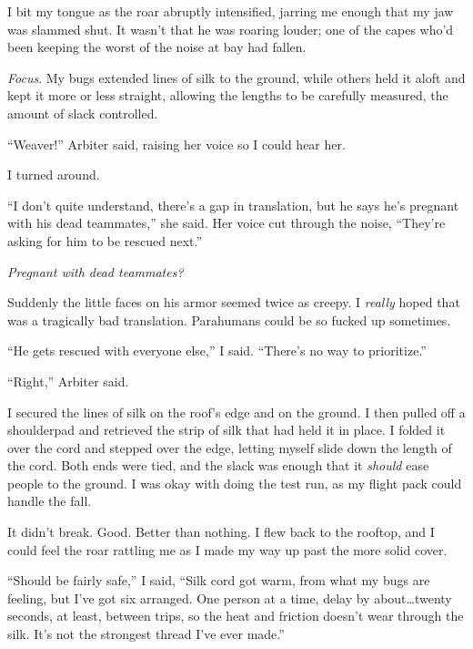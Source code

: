 I bit my tongue as the roar abruptly intensified, jarring me enough that my jaw was slammed shut.  It wasn't that he was roaring louder; one of the capes who'd been keeping the worst of the noise at bay had fallen.



\emph{Focus}.  My bugs extended lines of silk to the ground, while others held it aloft and kept it more or less straight, allowing the lengths to be carefully measured, the amount of slack controlled.



``Weaver!'' Arbiter said, raising her voice so I could hear her.



I turned around.



``I don't quite understand, there's a gap in translation, but he says he's pregnant with his dead teammates,'' she said.  Her voice cut through the noise, ``They're asking for him to be rescued next.''



\emph{Pregnant with dead teammates?}



Suddenly the little faces on his armor seemed twice as creepy.  I \emph{really} hoped that was a tragically bad translation.  Parahumans could be so fucked up sometimes.



``He gets rescued with everyone else,'' I said.  ``There's no way to prioritize.''



``Right,'' Arbiter said.



I secured the lines of silk on the roof's edge and on the ground.  I then pulled off a shoulderpad and retrieved the strip of silk that had held it in place.  I folded it over the cord and stepped over the edge, letting myself slide down the length of the cord.  Both ends were tied, and the slack was enough that it \emph{should} ease people to the ground.  I was okay with doing the test run, as my flight pack could handle the fall.



It didn't break.  Good.  Better than nothing.  I flew back to the rooftop, and I could feel the roar rattling me as I made my way up past the more solid cover.



``Should be fairly safe,'' I said, ``Silk cord got warm, from what my bugs are feeling, but I've got six arranged.  One person at a time, delay by about\ldots twenty seconds, at least, between trips, so the heat and friction doesn't wear through the silk.  It's not the strongest thread I've ever made.''



